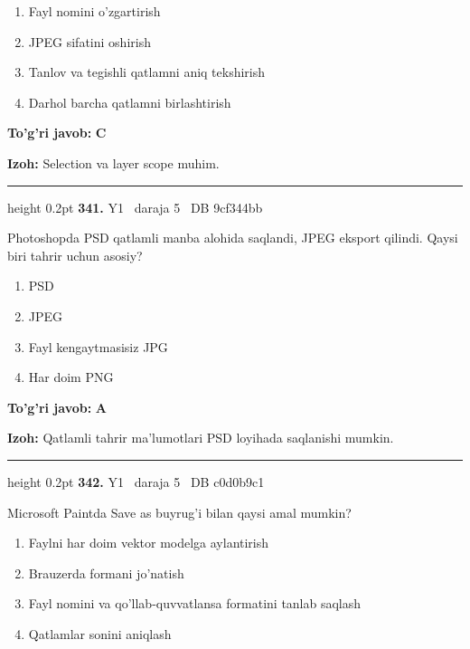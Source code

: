 \documentclass[10pt,a4paper,oneside]{article}
\begin{document}
\begin{enumerate}[label=\Alph*),leftmargin=9mm]
\item Fayl nomini o'zgartirish
\item JPEG sifatini oshirish
\item Tanlov va tegishli qatlamni aniq tekshirish
\item Darhol barcha qatlamni birlashtirish
\end{enumerate}
\begin{tcolorbox}[enhanced,breakable,colback=teal!4,colframe=teal!45!black,boxrule=0.45pt,arc=1.2mm,left=2.8mm,right=2.8mm,top=2mm,bottom=2mm,before skip=2mm,after skip=2mm]
\textbf{\color{teal}To'g'ri javob:} \textbf{C}
\par\smallskip
\textbf{Izoh:} Selection va layer scope muhim.
\end{tcolorbox}
\vspace{2mm}\hrule height 0.2pt \vspace{4mm}
\hypertarget{q341}{\textbf{\color{ink}341.}}  {\color{muted}\scriptsize Y1 \textbullet\ daraja 5 \textbullet\ DB 9cf344bb}
\par
Photoshopda PSD qatlamli manba alohida saqlandi, JPEG eksport qilindi. Qaysi biri tahrir uchun asosiy?
\begin{enumerate}[label=\Alph*),leftmargin=9mm]
\item PSD
\item JPEG
\item Fayl kengaytmasisiz JPG
\item Har doim PNG
\end{enumerate}
\begin{tcolorbox}[enhanced,breakable,colback=teal!4,colframe=teal!45!black,boxrule=0.45pt,arc=1.2mm,left=2.8mm,right=2.8mm,top=2mm,bottom=2mm,before skip=2mm,after skip=2mm]
\textbf{\color{teal}To'g'ri javob:} \textbf{A}
\par\smallskip
\textbf{Izoh:} Qatlamli tahrir ma'lumotlari PSD loyihada saqlanishi mumkin.
\end{tcolorbox}
\vspace{2mm}\hrule height 0.2pt \vspace{4mm}
\hypertarget{q342}{\textbf{\color{ink}342.}}  {\color{muted}\scriptsize Y1 \textbullet\ daraja 5 \textbullet\ DB c0d0b9c1}
\par
Microsoft Paintda Save as buyrug'i bilan qaysi amal mumkin?
\begin{enumerate}[label=\Alph*),leftmargin=9mm]
\item Faylni har doim vektor modelga aylantirish
\item Brauzerda formani jo'natish
\item Fayl nomini va qo'llab-quvvatlansa formatini tanlab saqlash
\item Qatlamlar sonini aniqlash
\end{enumerate}
\end{document}
